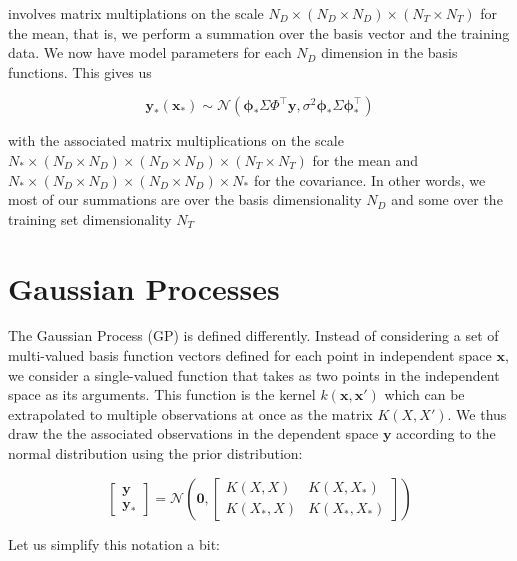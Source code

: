 \documentclass{article}
\begin{document}
involves matrix multiplations on the scale $N_D \times (N_D \times N_D) \times (N_T \times N_T)$ for the mean, that is, we perform a summation over the basis vector and the training data. We now have model parameters for each $N_D$ dimension in the basis functions. This gives us

\begin{equation}
\label{BLR_posterior}
    \mathbf{y_\ast}(\mathbf{x}_\ast)\sim\mathcal{N}(\boldsymbol{\phi}_\ast\Sigma \Phi^\top\mathbf{y} ,\sigma^2\boldsymbol{\phi}_\ast\Sigma\boldsymbol{\phi}_\ast^\top)
\end{equation} 

with the associated matrix multiplications on the scale $N_\ast \times(N_D \times N_D) \times (N_D \times N_D) \times (N_T \times N_T)$ for the mean and $N_\ast \times (N_D \times N_D) \times (N_D \times N_D) \times N_\ast$ for the covariance. In other words, we most of our summations are over the basis dimensionality $N_D$ and some over the training set dimensionality $N_T$


\section{Gaussian Processes}

The Gaussian Process (GP) is defined differently. Instead of considering a set of multi-valued basis function vectors defined for each point in independent space $\mathbf{x}$, we consider a single-valued function that takes as two points in the independent space as its arguments. This function is the kernel $k(\mathbf{x},\mathbf{x}')$ which can be extrapolated to multiple observations at once as the matrix $K(X,X')$. We thus draw the the associated observations in the dependent space $\mathbf{y}$ according to the normal distribution using the prior distribution:

\begin{equation}
    \begin{bmatrix}
    \mathbf{y} \\
    \mathbf{y_\ast}
    \end{bmatrix} =
    \mathcal{N}\left(\mathbf{0},
    \begin{bmatrix}
    K(X,X) & K(X,X_\ast) \\
    K(X_\ast,X) & K(X_\ast,X_\ast)
    \end{bmatrix}\right)
\end{equation} 

Let us simplify this notation a bit:
\end{document}
